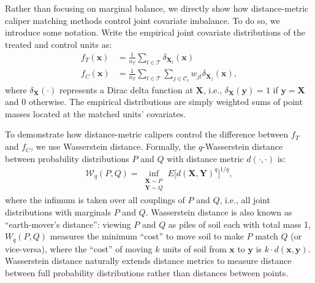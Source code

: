 \documentclass{article}
\newcommand{\bX}{\mathbf{X}}
\newcommand{\Xt}{\mathbf{X}_t}
\newcommand{\Xj}{\mathbf{X}_j}
\newcommand{\Ct}{\mathcal{C}_{t}}
\newcommand{\ind}[1]{\mathds{1} \{ #1 \} }
\begin{document}
Rather than focusing on marginal balance, we directly show how distance-metric caliper matching methods control joint covariate imbalance.
To do so, we introduce some notation.
Write the empirical joint covariate distributions of the treated and control units as:
\begin{align*}
    f_T(\mathbf{x}) 
    &= \frac{1}{n_T} \sum_{t \in \mathcal{T}} \delta_{\Xt}(\mathbf{x}) \\
    f_C(\mathbf{x}) 
    &= \frac{1}{n_T} \sum_{t \in \mathcal{T}} \sum_{j \in \Ct} w_{jt} \delta_{\Xj} (\mathbf{x}),
\end{align*}
where $\delta_{\bX}(\cdot)$ represents a Dirac delta function at $\bX$, i.e., $\delta_{\bX}(\mathbf{y}) = 1$ if $\mathbf{y} = \mathbf{X}$ and $0$ otherwise.
The empirical distributions are simply weighted sums of point masses located at the matched units' covariates.

To demonstrate how distance-metric calipers control the difference between $f_T$ and $f_C$, we use Wasserstein distance.
Formally, the $q$-Wasserstein distance between probability distributions $P$ and $Q$ with distance metric $d(\cdot, \cdot)$ is:
\begin{align*}
    \mathcal{W}_q(P, Q) = \inf_{\substack{\bX \sim P \\ \mathbf{Y} \sim Q}} E\big[ d(\bX, \mathbf{Y})^q \big]^{1/q},
\end{align*}
where the infimum is taken over all couplings of $P$ and $Q$, i.e., all joint distributions with marginals $P$ and $Q$.
Wasserstein distance is also known as ``earth-mover's distance'':
viewing $P$ and $Q$ as piles of soil each with total mass 1, $W_q(P, Q)$ measures the minimum ``cost'' to move soil to make $P$ match $Q$ (or vice-versa), where the ``cost'' of moving $k$ units of soil from $\mathbf{x}$ to $\mathbf{y}$ is $k\cdot d(\mathbf{x}, \mathbf{y})$.
Wasserstein distance naturally extends distance metrics to measure distance between full probability distributions rather than distances between points.
\end{document}

